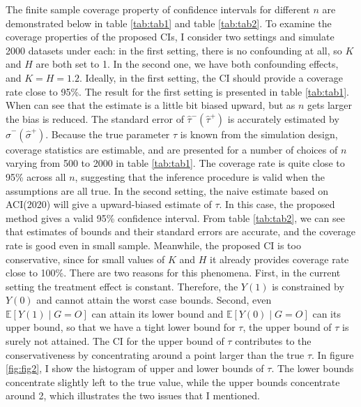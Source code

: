 \documentclass[12pt]{article}
\begin{document}
  The finite sample coverage property of confidence intervals for different $n$ are demonstrated below in table \ref{tab:tab1} and table \ref{tab:tab2}. To examine the coverage properties of the proposed CIs, I consider two settings and simulate 2000 datasets under each: in the first setting, there is no confounding at all, so $K$ and $H$ are both set to 1.
    In the second one, we have both confounding effects, and $K = H = 1.2$. 
    Ideally, in the first setting, the CI should provide a coverage rate close to 95\%. The result for the first setting is presented in table \ref{tab:tab1}. When can see that the estimate is a little bit biased upward, but as $n$ gets larger the bias is reduced. The standard error of $\hat{\tau}^-(\hat{\tau}^+)$ is accurately estimated by $\hat{\sigma}^-(\hat{\sigma}^+)$.
    Because the true parameter $\tau$ is known from the simulation design, coverage statistics are estimable, and are presented for a number of choices of $n$ varying from 500 to 2000 in table \ref{tab:tab1}. The coverage rate is quite close to 95\% across all $n$, suggesting that the inference procedure is valid when the assumptions are all true.
    In the second setting, the naive estimate based on ACI(2020) will give a upward-biased estimate of $\tau$. In this case, the proposed method gives a valid 95\% confidence interval. 
    From table \ref{tab:tab2}, we can see that estimates of bounds and their standard errors are accurate, and the coverage rate is good even in small sample. 
    Meanwhile, the proposed CI is too conservative, since for small values of $K$ and $H$ it already provides coverage rate close to 100\%. There are two reasons for this phenomena. First, in the current setting the treatment effect is constant. Therefore, the $Y(1)$ is constrained by $Y(0)$ and cannot attain the worst case bounds. Second, even $\mathbb{E}[Y(1) \mid G = O]$ can attain its lower bound and $\mathbb{E}[Y(0) \mid G = O]$ can its upper bound, so that we have a tight lower bound for $\tau$, the upper bound of $\tau$ is surely not attained. The CI for the upper bound of $\tau$ contributes to the conservativeness by concentrating around a point larger than the true $\tau$. In figure \ref{fig:fig2}, I show the histogram of upper and lower bounds of $\tau$. The lower bounds concentrate slightly left to the true value, while the upper bounds concentrate around 2, which illustrates the two issues that I mentioned.
    
\end{document}
